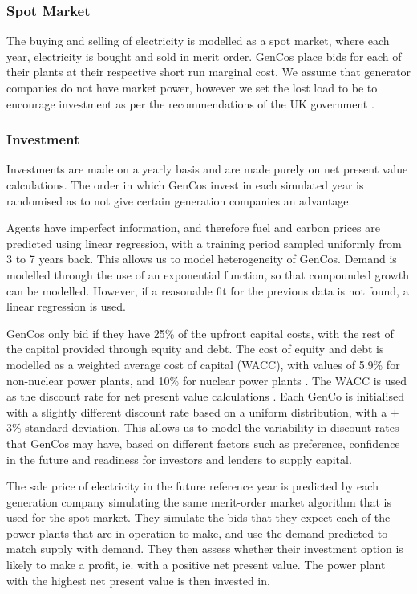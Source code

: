 \subsubsection{Spot Market}

The buying and selling of electricity is modelled as a spot market, where each year, electricity is bought and sold in merit order. GenCos place bids for each of their plants at their respective short run marginal cost. We assume that generator companies do not have market power, however we set the lost load to be  to encourage investment as per the recommendations of the UK government \cite{DECC2013}.

\subsubsection{Investment}

Investments are made on a yearly basis and are made purely on net present value calculations. The order in which GenCos invest in each simulated year is randomised as to not give certain generation companies an advantage.

Agents have imperfect information, and therefore fuel and carbon prices are predicted using linear regression, with a training period sampled uniformly from 3 to 7 years back. This allows us to model heterogeneity of GenCos. Demand is modelled through the use of an exponential function, so that compounded growth can be modelled. However, if a reasonable fit for the previous data is not found, a linear regression is used.

GenCos only bid if they have 25\% of the upfront capital costs, with the rest of the capital provided through equity and debt. The cost of equity and debt is modelled as a weighted average cost of capital (WACC), with values of 5.9\% for non-nuclear power plants, and 10\% for nuclear power plants \cite{KPMG2017, Paper2012}. The WACC is used as the discount rate for net present value calculations \cite{KincheloeStephenC1990TWAC}. Each GenCo is initialised with a slightly different discount rate based on a uniform distribution, with a $\pm$3\% standard deviation. This allows us to model the variability in discount rates that GenCos may have, based on different factors such as preference, confidence in the future and readiness for investors and lenders to supply capital.

The sale price of electricity in the future reference year is predicted by each generation company simulating the same merit-order market algorithm that is used for the spot market. They simulate the bids that they expect each of the power plants that are in operation to make, and use the demand predicted to match supply with demand. They then assess whether their investment option is likely to make a profit, ie. with a positive net present value. The power plant with the highest net present value is then invested in. 





